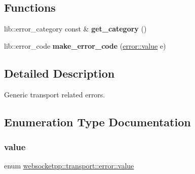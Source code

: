 \subsection*{Functions}
\begin{DoxyCompactItemize}
\item 
\mbox{\label{namespacewebsocketpp_1_1transport_1_1error_a25da4a3fca81d81e59802628924fd122}} 
lib\+::error\+\_\+category const  \& {\bfseries get\+\_\+category} ()
\item 
\mbox{\label{namespacewebsocketpp_1_1transport_1_1error_a7e7e335d77a9007c14af4d941a2baa93}} 
lib\+::error\+\_\+code {\bfseries make\+\_\+error\+\_\+code} (\mbox{\hyperlink{namespacewebsocketpp_1_1transport_1_1error_a8d371a2562d813e5a2e106e2694d4fb0}{error\+::value}} e)
\end{DoxyCompactItemize}


\subsection{Detailed Description}
Generic transport related errors. 

\subsection{Enumeration Type Documentation}
\mbox{\label{namespacewebsocketpp_1_1transport_1_1error_a8d371a2562d813e5a2e106e2694d4fb0}} 
\subsubsection{\texorpdfstring{value}{value}}
{\footnotesize\ttfamily enum \mbox{\hyperlink{namespacewebsocketpp_1_1transport_1_1error_a8d371a2562d813e5a2e106e2694d4fb0}{websocketpp\+::transport\+::error\+::value}}}

